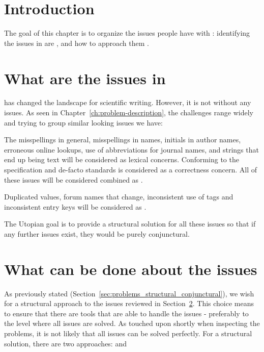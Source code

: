 
\section{Introduction}

The goal of this chapter is to organize the issues people have with
{\bibtex}: identifying the issues in {\bibtex} are
, and how to approach them
.


\section{What are the issues in {\bibtex}}
\label{sec:intro_what_issues}

{\bibtex} has changed the landscape for scientific writing.  However,
it is not without any issues.  As seen in
Chapter~\ref{ch:problem-description}, the challenges range widely and
trying to group similar looking issues we have:

The misspellings in general, misspellings in names, initials in author
names, erroneous online lookups, use of abbreviations for journal
names, and {\bibtex} strings that end up being text will be considered
as lexical concerns.  Conforming to the specification and de-facto
standards is considered as a correctness concern.  All of these issues
will be considered combined as .

Duplicated values, forum names that change, inconsistent use of tags
and inconsistent entry keys will be considered as .

The Utopian goal is to provide a structural solution for all these
issues so that if any further issues exist, they would be purely
conjunctural.


\section{What can be done about the {\bibtex} issues}
\label{sec:intro_what_to_do}

As previously stated
(Section~\ref{sec:problems_structural_conjunctural}), we wish for a
structural approach to the {\bibtex} issues reviewed in
Section~\ref{sec:intro_what_issues}.  This choice means to ensure that
there are tools that are able to handle the issues - preferably to the
level where all issues are solved.  As touched upon shortly when
inspecting the problems, it is not likely that all issues can be
solved perfectly.  For a structural solution, there are two
approaches: 
 and


